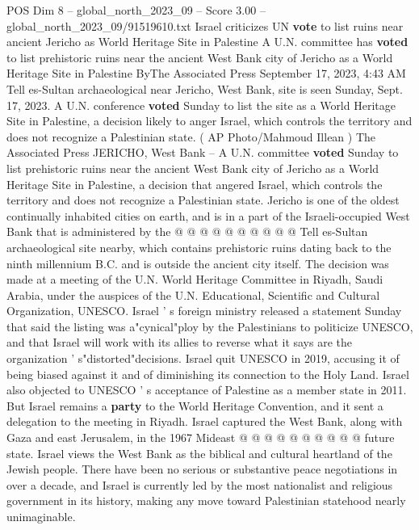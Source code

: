 \begin{textsample}{POS Dim 8 – global\_north\_2023\_09 – Score 3.00 – global\_north\_2023\_09/91519610.txt}  \label{ex:f8_pos_300}
Israel criticizes UN \textbf{vote} to list ruins near ancient Jericho as World Heritage Site in Palestine A U.N. committee has \textbf{voted} to list prehistoric ruins near the ancient West Bank city of Jericho as a World Heritage Site in Palestine ByThe Associated Press September 17, 2023, 4:43 AM Tell es-Sultan archaeological near Jericho, West Bank, site is seen Sunday, Sept. 17, 2023.
A U.N. conference \textbf{voted} Sunday to list the site as a World Heritage Site in Palestine, a decision likely to anger Israel, which controls the territory and does not recognize a Palestinian state. ( AP Photo/Mahmoud Illean ) The Associated Press JERICHO, West Bank -- A U.N. committee \textbf{voted} Sunday to list prehistoric ruins near the ancient West Bank city of Jericho as a World Heritage Site in Palestine, a decision that angered Israel, which controls the territory and does not recognize a Palestinian state.
Jericho is one of the oldest continually inhabited cities on earth, and is in a part of the Israeli-occupied West Bank that is administered by the @ @ @ @ @ @ @ @ @ @ Tell es-Sultan archaeological site nearby, which contains prehistoric ruins dating back to the ninth millennium B.C. and is outside the ancient city itself.
The decision was made at a meeting of the U.N.
World Heritage Committee in Riyadh, Saudi Arabia, under the auspices of the U.N.
Educational, Scientific and Cultural Organization, UNESCO.
Israel ' s foreign ministry released a statement Sunday that said the listing was a"cynical"ploy by the Palestinians to politicize UNESCO, and that Israel will work with its allies to reverse what it says are the organization ' s"distorted"decisions.
Israel quit UNESCO in 2019, accusing it of being biased against it and of diminishing its connection to the Holy Land.
Israel also objected to UNESCO ' s acceptance of Palestine as a member state in 2011.
But Israel remains a \textbf{party} to the World Heritage Convention, and it sent a delegation to the meeting in Riyadh.
Israel captured the West Bank, along with Gaza and east Jerusalem, in the 1967 Mideast @ @ @ @ @ @ @ @ @ @ future state.
Israel views the West Bank as the biblical and cultural heartland of the Jewish people.
There have been no serious or substantive peace negotiations in over a decade, and Israel is currently led by the most nationalist and religious government in its history, making any move toward Palestinian statehood nearly unimaginable.

\end{textsample}
